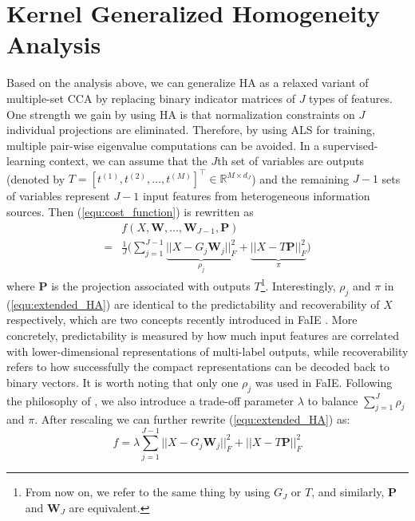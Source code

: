 \documentclass[a4paper]{article}
\begin{document}
\section{Kernel Generalized Homogeneity Analysis}
\label{sec:KGHA}
Based on the analysis above, we can generalize HA as a relaxed variant of multiple-set CCA by replacing binary indicator matrices of $J$ types of features. 
One strength we gain by using HA is that normalization constraints on $J$ individual projections are eliminated.         
Therefore, by using ALS for training, multiple pair-wise eigenvalue computations can be avoided.  
In a supervised-learning context, we can assume that the $J$th set of variables are outputs (denoted by $T=[t^{(1)},t^{(2)},\ldots, t^{(M)}]^\top \in \mathbb{R}^{M\times d_J}$) 
and the remaining $J-1$ sets of variables represent $J-1$ input features from heterogeneous information sources. Then (\ref{equ:cost_function}) is rewritten as
\begin{equation} 
    \begin{array}{cl}
         & \displaystyle f(X,\mathbf{W},\ldots, \mathbf{W}_{J-1}, \mathbf{P}) \\
        =& \displaystyle\frac{1}{J} \Bigg( \sum_{j=1}^{J-1} \underbrace{||X-G_j \mathbf{W}_j||_F^2}_{\rho_j}+\underbrace{||X-T \mathbf{P}||_F^2}_{\pi} \Bigg)
   \end{array}
  \label{equ:extended_HA}
\end{equation}
where $\mathbf{P}$ is the projection associated with outputs $T$\footnote{From now on, we refer to the same thing by using $G_J$ or $T$, and similarly, $\mathbf{P}$
and $\mathbf{W}_J$ are equivalent.}. Interestingly, $\rho_j$ and $\pi$ in (\ref{equ:extended_HA}) are identical to the predictability 
and recoverability of $X$ respectively, which are two concepts recently introduced in FaIE \citep{lin_2014_icml}. More concretely, predictability is measured by how much  
input features are correlated with lower-dimensional representations of multi-label outputs, while recoverability refers to how successfully the compact representations 
can be decoded back to binary vectors. It is worth noting that only one $\rho_j$ was used in FaIE.  
Following the philosophy of \citet{lin_2014_icml}, we also introduce a trade-off parameter $\lambda$ to balance $\sum_{j=1}^J \rho_j$ and $\pi$.  After rescaling we can further 
rewrite (\ref{equ:extended_HA}) as:
\begin{equation} 
    f=\displaystyle\lambda \sum_{j=1}^{J-1} ||X-G_j \mathbf{W}_j||_F^2+||X-T \mathbf{P}||_F^2 
  \label{equ:tradeoff_HA}
\end{equation}
\end{document}
